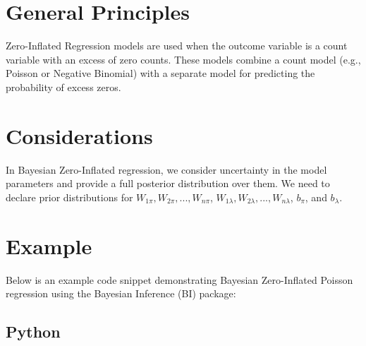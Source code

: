 \documentclass[
  letterpaper,
  DIV=11,
  numbers=noendperiod]{scrreprt}
\begin{document}
\section{General Principles}\label{general-principles-10}

Zero-Inflated Regression models are used when the outcome variable is a
count variable with an excess of zero counts. These models combine a
count model (e.g., Poisson or Negative Binomial) with a separate model
for predicting the probability of excess zeros.

\section{Considerations}\label{considerations-10}

\begin{tcolorbox}[enhanced jigsaw, toptitle=1mm, opacityback=0, titlerule=0mm, breakable, bottomrule=.15mm, colframe=quarto-callout-caution-color-frame, arc=.35mm, coltitle=black, left=2mm, opacitybacktitle=0.6, leftrule=.75mm, toprule=.15mm, rightrule=.15mm, bottomtitle=1mm, colbacktitle=quarto-callout-caution-color!10!white, title=\textcolor{quarto-callout-caution-color}{\faFire}\hspace{0.5em}{Caution}, colback=white]

In Bayesian Zero-Inflated regression, we consider uncertainty in the
model parameters and provide a full posterior distribution over them. We
need to declare prior distributions for
\(W_{1\pi}, W_{2\pi}, ..., W_{n\pi}\),
\(W_{1\lambda}, W_{2\lambda}, ..., W_{n\lambda}\), \(b_\pi\), and
\(b_\lambda\).

\end{tcolorbox}

\section{Example}\label{example-10}

Below is an example code snippet demonstrating Bayesian Zero-Inflated
Poisson regression using the Bayesian Inference (BI) package:

\subsection{Python}
\end{document}
